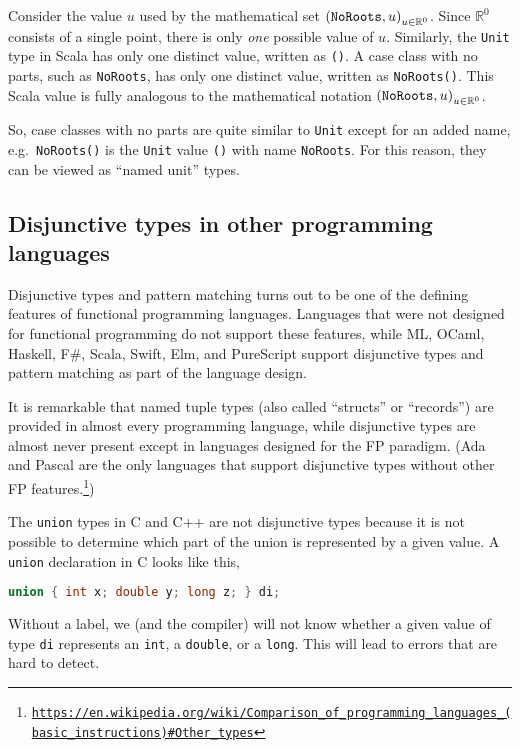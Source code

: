 Consider the value $u$ used by the mathematical set $\left(\text{\texttt{NoRoots}},u\right)_{u\in\mathbb{R}^{0}}$.
Since $\mathbb{R}^{0}$ consists of a single point, there is only
\emph{one} possible value of $u$. Similarly, the \lstinline!Unit!
type in Scala has only one distinct value, written as \lstinline!()!.
A case class with no parts, such as \lstinline!NoRoots!, has only
one distinct value, written as \lstinline!NoRoots()!. This Scala
value is fully analogous to the mathematical notation $\left(\text{\texttt{NoRoots}},u\right)_{u\in\mathbb{R}^{0}}$.

So, case classes with no parts are quite similar to \lstinline!Unit!
except for an added name, e.g.~\lstinline!NoRoots()! is the \lstinline!Unit!
value \lstinline!()! with name \lstinline!NoRoots!. For this reason,
they can be viewed as ``named unit'' types.

\subsection{Disjunctive types in other programming languages}

Disjunctive types and pattern matching turns out to be one of the
defining features of functional programming languages. Languages that
were not designed for functional programming do not support these
features, while ML, OCaml, Haskell, F\#, Scala, Swift, Elm, and PureScript
support disjunctive types and pattern matching as part of the language
design. 

It is remarkable that named tuple types (also called ``structs''
or ``records'') are provided in almost every programming language,
while disjunctive types are almost never present except in languages
designed for the FP paradigm. (Ada and Pascal are the only languages
that support disjunctive types without other FP features.\footnote{\texttt{\href{https://en.wikipedia.org/wiki/Comparison_of_programming_languages_(basic_instructions)\#Other_types}{https://en.wikipedia.org/wiki/Comparison\_of\_programming\_languages\_(basic\_instructions)\#Other\_types}}})

The \lstinline!union! types in C and C++ are not disjunctive types
because it is not possible to determine which part of the union is
represented by a given value. A \lstinline!union! declaration in
C looks like this,
\begin{lstlisting}[language=C]
union { int x; double y; long z; } di;
\end{lstlisting}
Without a label, we (and the compiler) will not know whether a given
value of type \lstinline!di! represents an \lstinline!int!, a \lstinline!double!,
or a \lstinline!long!. This will lead to errors that are hard to
detect.

